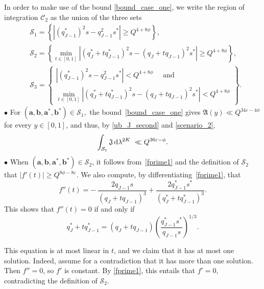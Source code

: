\documentclass[12pt, reqno]{amsart}
\theoremstyle{definition}
\theoremstyle{remark}
\numberwithin{equation}{section}
\def\lam{{\lambda}} \def\Lam{{\Lambda}} \def\Lamtil{{\widetilde \Lambda}}
\def\eps{\varepsilon}
\def\geq{\geqslant}
\def\d{{\,{\rm d}}}
\def \ba {\mathbf a}
\def \bb {\mathbf b}
\def \fA {\mathfrak A}
\def \fJ {\mathfrak J}
\def \cC {\mathcal C}
\def \cS {\mathcal S}
\begin{document}
In order to make use of the bound \eqref{bound_case_one}, we write the region of integration $\cC_2$ as the union of the three sets 
\[ 
\begin{aligned}
&\cS_1 = \left\{
|(q_{J-1}^*)^2 s - q_{J-1}^2 s^*|\geq Q^{4+8\phi} \right\},\\
&\cS_2 = \left\{
\min_{t\in [0,1]}\left|(q_J^* + t q_{J-1}^*)^2 s - (q_J + t q_{J-1})^2 s^*\right|\geq Q^{4+8\phi} \right\}, \\
&\cS_3  
= \left\{
\begin{array}{l}
|(q_{J-1}^*)^2 s - q_{J-1}^2 s^*|<Q^{4+8\phi} \quad \text{ and } \\ \displaystyle \min_{t\in [0,1]}\left|(q_J^* + t q_{J-1}^*)^2 s - (q_J + t q_{J-1})^2 s^*\right|< Q^{4+8\phi}  
\end{array}\right\}.
\end{aligned}
\]
$\bullet$ For $(\ba,\bb,\ba^*,\bb^*)\in\cS_1,$ the bound~\eqref{bound_case_one} gives $\fA(y)\ll Q^{34\eps - 4\phi}$ for every $y\in[0,1]$, and thus, by \eqref{ub_J_second} and \eqref{scenario_2},
\begin{equation}
\label{Contribution2221}
\int_{\cS_1}\fJ \d \lam^{2K} \  \ll Q^{36\eps - \phi}.
\end{equation}
$\bullet$ When $(\ba,\bb,\ba^*,\bb^*)\in\cS_2$, it follows from~\eqref{fprime1} and the definition of $\cS_2$ that  $|f'(t)|\geq Q^{8\phi - 8\varepsilon}$. We also compute, by differentiating~\eqref{fprime1}, that
\[
f''(t) = - \: \frac{2q_{J-1}s}{(q_J + tq_{J-1})^3} +
\frac{2q_{J-1}^*s^*}{(q_J^* + tq_{J-1}^*)^3}.
\]
This shows that $f''(t)=0$ if and only if
\[
q_J^* + tq_{J-1}^*=\left(q_J + tq_{J-1}\right)\left(\frac{q_{J-1}^*s^*}{q_{J-1}s}\right)^{1/3}.
\]

This equation is at most linear in $t$, and we claim that it has at most one solution. Indeed, assume for a contradiction that it has more than one solution. Then $f'' = 0$, so $f'$ is constant. By \eqref{fprime1}, this entails that $f' = 0$, contradicting the definition of $\cS_2$.
\end{document}

